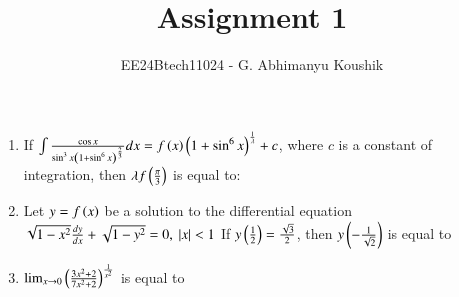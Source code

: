 \documentclass[journal,12pt,onecolumn]{IEEEtran}
\theoremstyle{remark}
\begin{document}
\title{Assignment 1}
\author{EE24Btech11024 - G. Abhimanyu Koushik}
\maketitle
\renewcommand{\thefigure}{\theenumi}
\renewcommand{\thetable}{\theenumi}
\begin{enumerate}

\item If $\int \frac{\cos x}{\sin^{3}x\left(1+\sin^{6}x\right)^{\frac{2}{3}}}dx = f\left(x\right)\left(1+\sin^{6}x\right)^{\frac{1}{\lambda}}+c$, where $c$ is a constant of integration, then $\lambda f\left(\frac{\pi}{3}\right)$ is equal to:

\hfill{}
\begin{enumerate}
\end{enumerate}

\item Let $y=f\left(x\right)$ be a solution to the differential equation $\sqrt{1-x^2}\frac{dy}{dx}+\sqrt{1-y^2} = 0 \text{, } \left\vert x\right\vert<1$ If $y\left(\frac{1}{2}\right) = \frac{\sqrt{3}}{2}$, then $y\left(-\frac{1}{\sqrt{2}}\right)$ is equal to

\hfill{}
\begin{enumerate}
\end{enumerate}

\item $\lim_{x\to 0}\left(\frac{3x^2+2}{7x^2+2}\right)^{\frac{1}{x^2}}$ is equal to

\hfill{}
\begin{enumerate}
\end{enumerate}


\end{enumerate}
\end{document}
